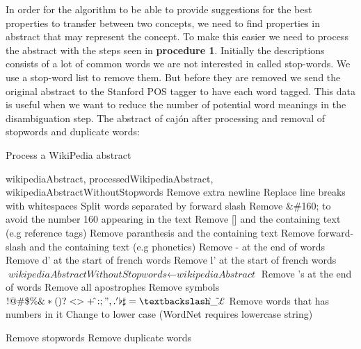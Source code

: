 In order for the algorithm to be able to provide suggestions for the best properties to transfer between two concepts, we need to find properties in abstract that may represent the concept. To make this easier we need to process the abstract with the steps seen in \textbf{procedure 1}. Initially the descriptions consists of a lot of common words we are not interested in called stop-words. We use a stop-word list to remove them. But before they are removed we send the original abstract to the Stanford POS tagger to have each word tagged. This data is useful when we want to reduce the number of potential word meanings in the disambiguation step.
The abstract of cajón after processing and removal of stopwords and duplicate words:
\noindent{}

\begin{algorithm}
	\caption{Process a WikiPedia abstract}\label{euclid}
	\begin{algorithmic}[1]
		\Require wikipediaAbstract,
		\Ensure processedWikipediaAbstract, wikipediaAbstractWithoutStopwords
		\State Remove extra newline
		\State Replace line breaks with whitespaces
		\State Split words separated by forward slash
		\State Remove \&\#160; to avoid the number 160 appearing in the text
		\State Remove [] and the containing text (e.g reference tags)
		\State Remove paranthesis and the containing text
		\State Remove forward-slash and the containing text (e.g phonetics)
		\State Remove - at the end of words
		\State Remove d' at the start of french words
		\State Remove l' at the start of french words
		\EndFor
		\State $\textit{wikipediaAbstractWithoutStopwords} \gets \textit{wikipediaAbstract}$
		\State Remove 's at the end of words
		\State Remove all apostrophes
		\State Remove symbols $!@\#\$\%\&*(){}?<>+\hat{}:;",.'\flat\sharp=\textbackslash\grave{}\_\tilde{}\pounds$\texteuro\textcurrency
		\State Remove words that has numbers in it
		\State Change to lower case (WordNet requires lowercase string)
		
		\State Remove stopwords
		\State Remove duplicate words
		\EndFor
		
		\State {}
		\EndProcedure
	\end{algorithmic}
\end{algorithm}

